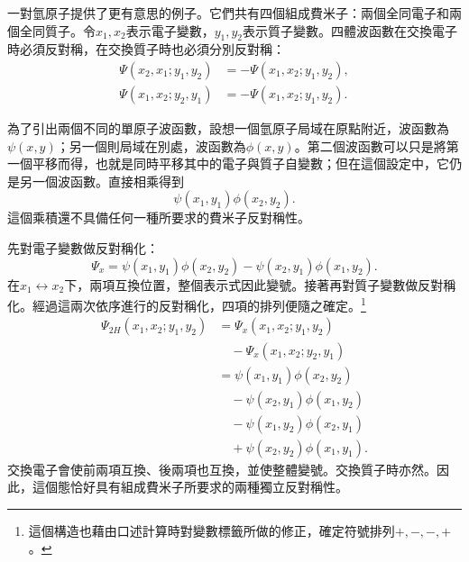 一對氫原子提供了更有意思的例子。它們共有四個組成費米子：兩個全同電子和兩個全同質子。令\(x_1,x_2\)表示電子變數，\(y_1,y_2\)表示質子變數。四體波函數在交換電子時必須反對稱，在交換質子時也必須分別反對稱：
\begin{align}
\Psi(x_2,x_1;y_1,y_2)
&=-\Psi(x_1,x_2;y_1,y_2),\\
\Psi(x_1,x_2;y_2,y_1)
&=-\Psi(x_1,x_2;y_1,y_2).
\end{align}

為了引出兩個不同的單原子波函數，設想一個氫原子局域在原點附近，波函數為\(\psi(x,y)\)；另一個則局域在別處，波函數為\(\phi(x,y)\)。第二個波函數可以只是將第一個平移而得，也就是同時平移其中的電子與質子自變數；但在這個設定中，它仍是另一個波函數。直接相乘得到
\begin{equation}
\psi(x_1,y_1)\phi(x_2,y_2).
\end{equation}
這個乘積還不具備任何一種所要求的費米子反對稱性。

先對電子變數做反對稱化：
\begin{equation}
\Psi_x=
\psi(x_1,y_1)\phi(x_2,y_2)
-\psi(x_2,y_1)\phi(x_1,y_2).
\end{equation}
在\(x_1\leftrightarrow x_2\)下，兩項互換位置，整個表示式因此變號。接著再對質子變數做反對稱化。經過這兩次依序進行的反對稱化，四項的排列便隨之確定。\footnote{這個構造也藉由口述計算時對變數標籤所做的修正，確定符號排列\(+,-,-,+\)。}
\begin{align}
\Psi_{2H}(x_1,x_2;y_1,y_2)
&=\Psi_x(x_1,x_2;y_1,y_2)\nonumber\\
&\quad{}-\Psi_x(x_1,x_2;y_2,y_1)\\
&=\psi(x_1,y_1)\phi(x_2,y_2)\nonumber\\
&\quad{}-\psi(x_2,y_1)\phi(x_1,y_2)\nonumber\\
&\quad{}-\psi(x_1,y_2)\phi(x_2,y_1)\nonumber\\
&\quad{}+\psi(x_2,y_2)\phi(x_1,y_1).
\label{eq:two-hydrogen-antisymmetrized}
\end{align}
交換電子會使前兩項互換、後兩項也互換，並使整體變號。交換質子時亦然。因此，這個態恰好具有組成費米子所要求的兩種獨立反對稱性。

\begin{classroomqa}
\end{classroomqa}

